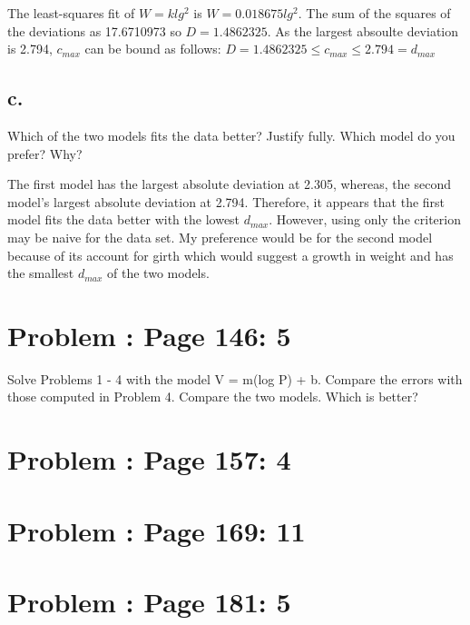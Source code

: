 \documentclass[]{article}
\begin{document}
The least-squares fit of \(W = klg^2\) is \(W = 0.018675lg^2\). The sum
of the squares of the deviations as 17.6710973 so \(D = 1.4862325\). As
the largest absoulte deviation is 2.794, \(c_{max}\) can be bound as
follows: \(D = 1.4862325 \leq c_{max} \leq 2.794 = d_{max}\)

\subsection{c.}\label{c.}

Which of the two models fits the data better? Justify fully. Which model
do you prefer? Why?

The first model has the largest absolute deviation at 2.305, whereas,
the second model's largest absolute deviation at 2.794. Therefore, it
appears that the first model fits the data better with the lowest
\(d_{max}\). However, using only the criterion may be naive for the data
set. My preference would be for the second model because of its account
for girth which would suggest a growth in weight and has the smallest
\(d_{max}\) of the two models.

\section{Problem : Page 146: 5}\label{problem-page-146-5}

Solve Problems 1 - 4 with the model V = m(log P) + b. Compare the errors
with those computed in Problem 4. Compare the two models. Which is
better?

\section{Problem : Page 157: 4}\label{problem-page-157-4}

\section{Problem : Page 169: 11}\label{problem-page-169-11}

\section{Problem : Page 181: 5}\label{problem-page-181-5}
\end{document}
